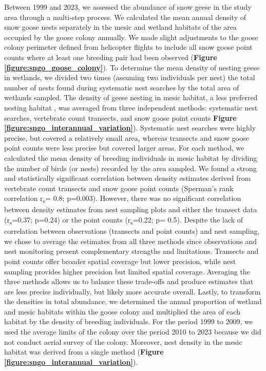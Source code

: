 \documentclass[a4paper,twoside,12pt]{article}
\begin{document}
\begin{enumerate}[label=\alph*.]
       Between 1999 and 2023, we assessed the abundance of snow geese in the study area through a multi-step process. We calculated the mean annual density of snow goose nests separately in the mesic and wetland habitats of the area occupied by the goose colony annually. We made slight adjustments to the goose colony perimeter defined from helicopter flights to include all snow goose point counts where at least one breeding pair had been observed (\textbf{Figure \ref{figure:sngo_goose_colony}}). To determine the mean density of nesting geese in wetlands, we divided two times (assuming two individuals per nest) the total number of nests found during systematic nest searches by the total area of wetlands sampled. The density of geese nesting in mesic habitat, a less preferred nesting habitat \citep{lecomte2008}, was averaged from three independent methods: systematic nest searches, vertebrate count transects, and snow goose point counts \textbf{Figure \ref{figure:sngo_interannual_variation}}). Systematic nest searches were highly precise, but covered a relatively small area, whereas transects and snow goose point counts were less precise but covered larger areas. For each method, we calculated the mean density of breeding individuals in mesic habitat by dividing the number of birds (or nests) recorded by the area sampled. We found a strong and statistically significant correlation between density estimates derived from vertebrate count transects and snow goose point counts (Sperman's rank correlation r\textsubscript{s}= 0.8; p=0.003). However, there was no significant correlation between density estimates from nest sampling plots and either the transect data (r\textsubscript{s}=0.37; p=0.24) or the point counts (r\textsubscript{s}=0.22; p= 0.5). Despite the lack of correlation between observations (transects and point counts) and nest sampling, we chose to average the estimates from all three methods since observations and nest monitoring present complementary strengths and limitations. Transects and point counts offer broader spatial coverage but lower precision, while nest sampling provides higher precision but limited spatial coverage. Averaging the three methods allows us to balance these trade-offs and produce estimates that are less precise individually, but likely more accurate overall. Lastly, to transform the densities in total abundance, we determined the annual proportion of wetland and mesic habitats within the goose colony and multiplied the area of each habitat by the density of breeding individuals. For the period 1999 to 2009, we used the average limits of the colony over the period 2010 to 2023 because we did not conduct aerial survey of the colony. Moreover, nest density in the mesic habitat was derived from a single method (\textbf{Figure \ref{figure:sngo_interannual_variation}}). 
                        

\end{enumerate}
\end{document}
